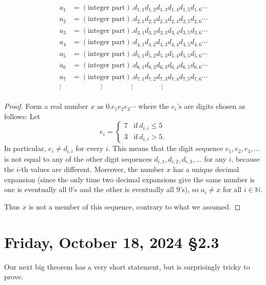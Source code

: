 \documentclass[12pt]{amsart}
\def\Fr{Friday}
\newcommand{\N}{\mathbb{N}}
\numberwithin{equation}{section}
\theoremstyle{plain} %
\newcommand{\Oct}[3]{\section{#2, October #1, 2024 \quad \S#3}}
\theoremstyle{definition}
\theoremstyle{remark}
\begin{document}
\	$$
	\begin{aligned}
	a_1 & = (\text{integer part}). d_{1,1} d_{1,2} d_{1,3} d_{1,4} d_{1,5} d_{1,6} \cdots \\
	a_2 & = (\text{integer part}). d_{2,1} d_{2,2} d_{2,3} d_{2,4} d_{2,5} d_{2,6}\cdots \\
	a_3 & = (\text{integer part}). d_{3,1} d_{3,2} d_{3,3} d_{3,4} d_{3,5} d_{3,6}\cdots \\
	a_4 & = (\text{integer part}). d_{4,1} d_{4,2} d_{4,3} d_{4,4} d_{4,5} d_{4,6}\cdots \\
	a_5 & = (\text{integer part}). d_{5,1} d_{5,2} d_{5,3} d_{5,4} d_{5,5} d_{5,6}\cdots \\
	a_6 & = (\text{integer part}). d_{6,1} d_{6,2} d_{6,3} d_{6,4} d_{6,5} d_{6,6}\cdots \\
	a_7 & = (\text{integer part}). d_{7,1} d_{7,2} d_{7,3} d_{7,4} d_{7,5} d_{7,6}\cdots \\
	\vdots &  \qquad  \qquad \vdots \qquad  \qquad \vdots \qquad  \qquad \vdots\\
	\end{aligned}
	$$
	
\begin{framed}	
	\begin{proof}
	Form a real number $x$ as $0.e_1 e_2 e_3 \cdots$ where the $e_i$'s are digits chosen as follows: 
	Let 
	\[e_i=\begin{cases} 7 & \text{if} \ d_{i,i}\leq 5\\
	3 & \text{if}\ d_{i,i}> 5.\end{cases}\]
	 In particular, $e_i\neq d_{i,i}$ for every $i$. This means that the digit sequence $e_1,e_2,e_3,\dots$ is not equal to any of the other digit sequences $d_{i,1}, d_{i,2},d_{i,3},\dots$ for any $i$, because the $i$-th values are different. Moreover, the number $x$ has a unique decimal expansion (since the only time two decimal expansions give the same number is one is eventually all $0$'s and the other is eventually all $9$'s), so $a_i \neq x$ for all $i\in \N$.
		
	Thus $x$ is not a member of this sequence, contrary to what we assumed. 
\end{proof}
\end{framed}

\newpage




\Oct{18}{\Fr}{2.3}

Our next big theorem has a very short statement, but is surprisingly tricky to prove.
\end{document}
